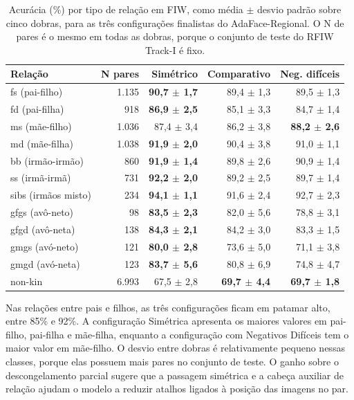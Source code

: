 \begin{table}[h]
\centering
\small
\setlength{\tabcolsep}{3pt}
\caption{Acurácia (\%) por tipo de relação em FIW, como média $\pm$ desvio padrão sobre cinco dobras, para as três configurações finalistas do AdaFace-Regional. O N de pares é o mesmo em todas as dobras, porque o conjunto de teste do RFIW Track-I é fixo.}
\label{tab:per_rel_compare}
\begin{tabular}{lrrrr}
\hline
\textbf{Relação} & \textbf{N pares} & \textbf{Simétrico} & \textbf{Comparativo} & \textbf{Neg. difíceis} \\
\hline
fs (pai-filho)      & 1.135 & \textbf{90{,}7 $\pm$ 1{,}7} & 89{,}4 $\pm$ 1{,}3 & 89{,}5 $\pm$ 1{,}3 \\
fd (pai-filha)      & 918   & \textbf{86{,}9 $\pm$ 2{,}5} & 85{,}1 $\pm$ 3{,}3 & 84{,}7 $\pm$ 1{,}4 \\
ms (mãe-filho)      & 1.036 & 87{,}4 $\pm$ 3{,}4 & 86{,}2 $\pm$ 3{,}8 & \textbf{88{,}2 $\pm$ 2{,}6} \\
md (mãe-filha)      & 1.038 & \textbf{91{,}9 $\pm$ 2{,}0} & 90{,}4 $\pm$ 3{,}8 & 91{,}0 $\pm$ 1{,}1 \\
bb (irmão-irmão)    & 860   & \textbf{91{,}9 $\pm$ 1{,}4} & 89{,}8 $\pm$ 2{,}6 & 90{,}9 $\pm$ 1{,}4 \\
ss (irmã-irmã)      & 731   & \textbf{92{,}2 $\pm$ 2{,}0} & 89{,}2 $\pm$ 2{,}5 & 89{,}7 $\pm$ 1{,}4 \\
sibs (irmãos misto) & 234   & \textbf{94{,}1 $\pm$ 1{,}1} & 91{,}6 $\pm$ 2{,}4 & 92{,}7 $\pm$ 2{,}3 \\
\hline
gfgs (avô-neto)     & 98  & \textbf{83{,}5 $\pm$ 2{,}3} & 82{,}0 $\pm$ 5{,}6 & 78{,}8 $\pm$ 3{,}1 \\
gfgd (avô-neta)     & 138 & \textbf{84{,}3 $\pm$ 2{,}1} & 84{,}2 $\pm$ 3{,}0 & 83{,}3 $\pm$ 1{,}5 \\
gmgs (avó-neto)     & 121 & \textbf{80{,}0 $\pm$ 2{,}8} & 73{,}6 $\pm$ 5{,}0 & 71{,}1 $\pm$ 3{,}8 \\
gmgd (avó-neta)     & 123 & \textbf{83{,}7 $\pm$ 5{,}6} & 80{,}8 $\pm$ 6{,}9 & 74{,}8 $\pm$ 4{,}7 \\
\hline
non-kin             & 6.993 & 67{,}5 $\pm$ 2{,}8 & \textbf{69{,}7 $\pm$ 4{,}4} & \textbf{69{,}7 $\pm$ 1{,}8} \\
\hline
\end{tabular}
\end{table}

Nas relações entre pais e filhos, as três configurações ficam em patamar alto, entre 85\% e 92\%. A configuração Simétrica apresenta os maiores valores em pai-filho, pai-filha e mãe-filha, enquanto a configuração com Negativos Difíceis tem o maior valor em mãe-filho. O desvio entre dobras é relativamente pequeno nessas classes, porque elas possuem mais pares no conjunto de teste. O ganho sobre o descongelamento parcial sugere que a passagem simétrica e a cabeça auxiliar de relação ajudam o modelo a reduzir atalhos ligados à posição das imagens no par.

